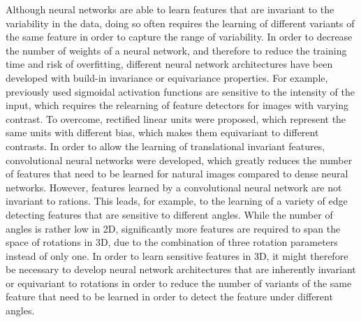 Although neural networks are able to learn features that are invariant to the
variability in the data, doing so often requires the learning of different
variants of the same feature in order to capture the range of variability. In
order to decrease the number of weights of a neural network, and therefore to
reduce the training time and risk of overfitting, different neural network
architectures have been developed with build-in invariance or equivariance
properties. For example, previously used sigmoidal activation functions are
sensitive to the intensity of the input, which requires the relearning of
feature detectors for images with varying contrast. To overcome, rectified
linear units were proposed, which represent the same units with different bias,
which makes them equivariant to different contrasts. In order to allow the
learning of translational invariant features, convolutional neural networks
were developed, which greatly reduces the number of features that need to be
learned for natural images compared to dense neural networks. However, features
learned by a convolutional neural network are not invariant to rations. This
leads, for example, to the learning of a variety of edge detecting features that
are sensitive to different angles. While the number of angles is rather low in
2D, significantly more features are required to span the space of rotations in
3D, due to the combination of three rotation parameters instead of only one. In
order to learn sensitive features in 3D, it might therefore be necessary to
develop neural network architectures that are inherently invariant or
equivariant to rotations in order to reduce the number of variants of the same
feature that need to be learned in order to detect the feature under different
angles.


